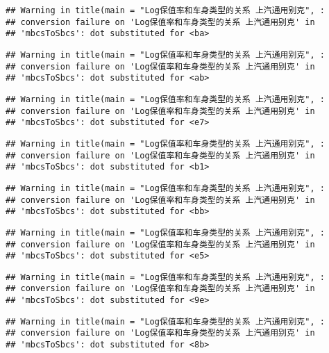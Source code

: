 \documentclass[]{article}
\begin{document}
\begin{verbatim}
## Warning in title(main = "Log保值率和车身类型的关系 上汽通用别克", :
## conversion failure on 'Log保值率和车身类型的关系 上汽通用别克' in
## 'mbcsToSbcs': dot substituted for <ba>
\end{verbatim}

\begin{verbatim}
## Warning in title(main = "Log保值率和车身类型的关系 上汽通用别克", :
## conversion failure on 'Log保值率和车身类型的关系 上汽通用别克' in
## 'mbcsToSbcs': dot substituted for <ab>
\end{verbatim}

\begin{verbatim}
## Warning in title(main = "Log保值率和车身类型的关系 上汽通用别克", :
## conversion failure on 'Log保值率和车身类型的关系 上汽通用别克' in
## 'mbcsToSbcs': dot substituted for <e7>
\end{verbatim}

\begin{verbatim}
## Warning in title(main = "Log保值率和车身类型的关系 上汽通用别克", :
## conversion failure on 'Log保值率和车身类型的关系 上汽通用别克' in
## 'mbcsToSbcs': dot substituted for <b1>
\end{verbatim}

\begin{verbatim}
## Warning in title(main = "Log保值率和车身类型的关系 上汽通用别克", :
## conversion failure on 'Log保值率和车身类型的关系 上汽通用别克' in
## 'mbcsToSbcs': dot substituted for <bb>
\end{verbatim}

\begin{verbatim}
## Warning in title(main = "Log保值率和车身类型的关系 上汽通用别克", :
## conversion failure on 'Log保值率和车身类型的关系 上汽通用别克' in
## 'mbcsToSbcs': dot substituted for <e5>
\end{verbatim}

\begin{verbatim}
## Warning in title(main = "Log保值率和车身类型的关系 上汽通用别克", :
## conversion failure on 'Log保值率和车身类型的关系 上汽通用别克' in
## 'mbcsToSbcs': dot substituted for <9e>
\end{verbatim}

\begin{verbatim}
## Warning in title(main = "Log保值率和车身类型的关系 上汽通用别克", :
## conversion failure on 'Log保值率和车身类型的关系 上汽通用别克' in
## 'mbcsToSbcs': dot substituted for <8b>
\end{verbatim}
\end{document}
